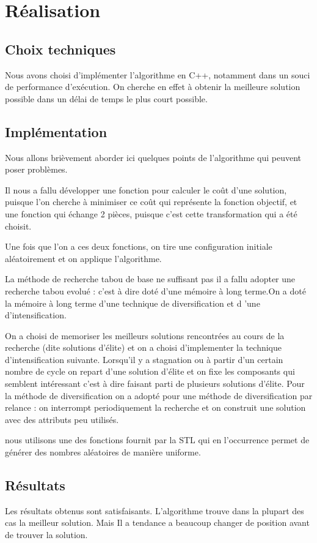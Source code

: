 \documentclass{report}
\begin{document}
\section{Réalisation}
\subsection{Choix techniques}
Nous avons choisi d'implémenter l'algorithme en C++, notamment dans un souci de performance d’exécution. On cherche en effet à obtenir la meilleure solution possible dans un délai de temps le plus court possible. 

\subsection{Implémentation}
 Nous allons brièvement aborder ici quelques points de l’algorithme qui peuvent poser problèmes.

Il nous a fallu développer une fonction pour calculer le coût d'une solution, puisque l'on cherche à minimiser ce coût qui représente la fonction objectif, et une fonction qui échange 2 pièces, puisque c'est cette transformation qui a été choisit.

Une fois que l'on a ces deux fonctions, on tire une configuration initiale aléatoirement et on applique l'algorithme.

La méthode de recherche tabou de base ne suffisant pas il a fallu adopter une recherche tabou evolué : c'est à dire doté d'une mémoire à long terme.On a doté la mémoire à long terme d'une technique de diversification et d 'une d'intensification.

On a choisi de memoriser les meilleurs solutions rencontrées au cours de la recherche (dite solutions d'élite) et on a choisi d'implementer la technique d'intensification suivante.
Lorsqu'il y a stagnation ou à partir d'un certain nombre de cycle on repart d'une solution d'élite
et on fixe les composants qui semblent intéressant c'est à dire faisant parti de plusieurs solutions d'élite.
Pour la méthode de diversification on a adopté pour une méthode  de diversification par relance :
on interrompt periodiquement la recherche et on construit une solution avec des attributs peu utilisés. 

 nous utilisons une des fonctions fournit par la STL qui en l’occurrence permet de générer des nombres aléatoires de manière uniforme.

\subsection{Résultats}
Les résultats obtenus sont satisfaisants. L'algorithme trouve dans la plupart des cas la meilleur solution. Mais Il a tendance a beaucoup changer de position avant de trouver la solution.
\end{document}
